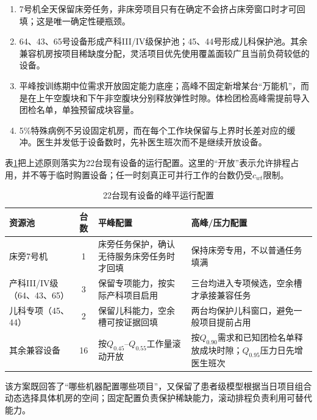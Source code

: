 \begin{enumerate}
  \item 7号机全天保留床旁任务，非床旁项目只有在确定不会挤占床旁窗口时才可回填；这是唯一确定性硬瓶颈。
  \item 64、43、65号设备形成产科III/IV级保护池；45、44号形成儿科保护池。其余兼容机房按项目稀缺度分配，灵活项目优先使用覆盖面较广且当前负荷较低的设备。
  \item 平峰按训练期中位需求开放固定能力底座；高峰不固定新增某台“万能机”，而是在上午空腹块和下午非空腹块分别释放弹性时隙。体检团检高峰需提前导入团检名单，单独预留成块容量。
  \item 5\%特殊病例不另设固定机房，而在每个工作块保留与上界时长差对应的缓冲。医生并发低于设备数时，先补医生班次而不是继续开放设备。
\end{enumerate}

表\ref{tab:peak-flat-plan}把上述原则落实为22台现有设备的运行配置。这里的“开放”表示允许排程占用，并不等于临时购置设备；任一时刻真正可并行工作的台数仍受$c_{wt}$限制。

\begin{table}[H]
  \centering
  \caption{22台现有设备的峰平运行配置}
  \label{tab:peak-flat-plan}
  \begin{tabularx}{\textwidth}{p{} c X X}
    \toprule
    资源池 & 台数 & 平峰配置 & 高峰/压力配置 \\
    \midrule
    床旁7号机 & 1 & 床旁任务保护，确认无待服务床旁任务时才回填 & 保持床旁专用，不以普通任务填满 \\
    产科III/IV级（64、43、65） & 3 & 保留专项能力，按实际产科项目启用 & 三台均进入专项候选，空余槽才承接兼容任务 \\
    儿科专项（45、44） & 2 & 保留儿科能力，空余槽可按证据回填 & 两台均保护儿科窗口，避免一般项目提前占用 \\
    其余兼容设备 & 16 & 按$Q_{0.45}$--$Q_{0.55}$工作量滚动开放 & 按$Q_{0.90}$需求和已知团检名单释放成块时隙；$Q_{0.95}$压力日先增医生班次 \\
    \bottomrule
  \end{tabularx}
\end{table}

该方案既回答了“哪些机器配置哪些项目”，又保留了患者级模型根据当日项目组合动态选择具体机房的空间；固定配置负责保护稀缺能力，滚动排程负责利用可替代能力。
